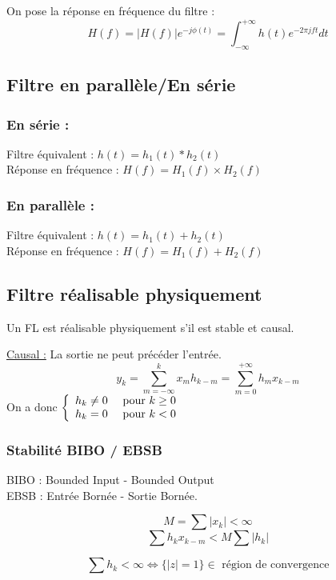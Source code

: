 \begin{Def}
On pose la réponse en fréquence du filtre : \[H(f)=|H(f)|e^{-j\phi(t)}=\int_{-\infty}^{+\infty} h(t)e^{-2\pi jft} dt\]
\end{Def}

\subsection{Filtre en parallèle/En série}
\subsubsection{En série :}
Filtre équivalent : $h(t)=h_1(t)*h_2(t)$ \\
Réponse en fréquence : $H(f)=H_1(f)\times H_2(f)$

\subsubsection{En parallèle :}
Filtre équivalent : $h(t)=h_1(t)+h_2(t)$ \\
Réponse en fréquence : $H(f)=H_1(f)+H_2(f)$

\subsection{Filtre réalisable physiquement}
\begin{Def}
Un FL est réalisable physiquement s'il est stable et causal.
\end{Def}

\ul{Causal :} La sortie ne peut précéder l'entrée.
\[y_k=\sum_{m=-\infty}^k x_m h_{k-m}=\sum_{m=0}^{+\infty}h_m x_{k-m}\]
On a donc $\left\{ \begin{array}{r c l}
h_k\neq 0 &\text{ pour } k\geq0\\
h_k=0 &\text{ pour } k<0
\end{array}
\right.$

\subsubsection{Stabilité BIBO / EBSB}
\noindent BIBO : Bounded Input - Bounded Output \\
EBSB : Entrée Bornée - Sortie Bornée.

\bigskip
\[M=\sum |x_k| <\infty\]
\[\sum h_k x_{k-m} < M\sum |h_k|\]
\begin{theo}
\[\sum h_k <\infty \Leftrightarrow \{|z|=1\}\in \text{ région de convergence}\]
\end{theo}

